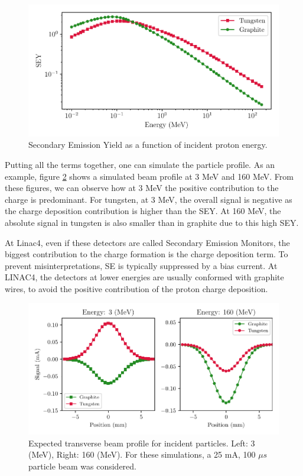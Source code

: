 \begin{figure}[h]
    \centering
    \includegraphics[width=0.93\columnwidth]{Figure_SEY/SEY_compa.pdf}
    \caption{Secondary Emission Yield as a function of incident proton energy. }
    \label{fig:SEYmat}
\end{figure}

Putting all the terms together, one can simulate the particle profile. As an example, figure \ref{fig:ProfComparison} shows a simulated beam profile at 3 MeV and 160 MeV. From these figures, we can observe how at 3 MeV the positive contribution to the charge is predominant. For tungsten, at 3 MeV, the overall signal is negative as the charge deposition contribution is higher than the SEY. At 160  MeV, the absolute signal in tungsten is also smaller than in graphite due to this high SEY.

At Linac4, even if these detectors are called Secondary Emission Monitors, the biggest contribution to the charge formation is the charge deposition term. To prevent misinterpretations, SE is typically suppressed by a bias current.  At LINAC4, the detectors at lower energies are usually conformed with graphite wires, to avoid the positive contribution of the proton charge deposition. 

\begin{figure}[h]
    \centering
    \includegraphics[width=\columnwidth]{Figure_ProfCompa/ProfileComparison.pdf}
    \caption{Expected transverse beam profile for incident \hm particles. Left: 3 (MeV), Right: 160 (MeV). For these simulations, a 25 mA, 100 $\mu s$ particle beam was considered. }
    \label{fig:ProfComparison}
\end{figure}

